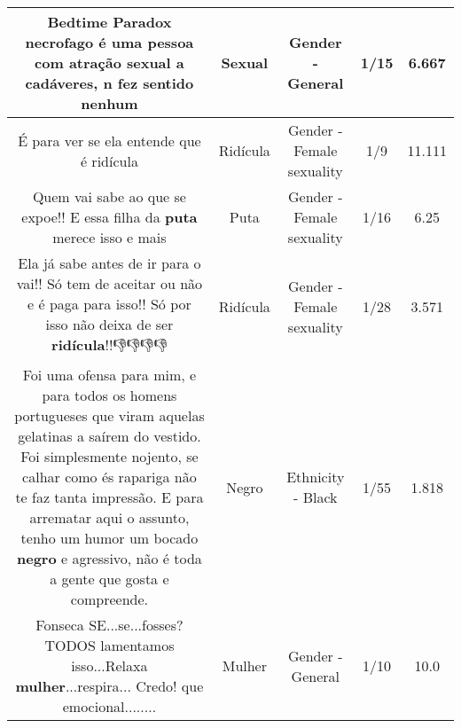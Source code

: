 \documentclass[11pt]{article}
\newlength\mylength
\begin{document}
\begin{center}
\begin{longtable}{|C{.65\mylength}|C{.30\mylength}|C{.12\mylength}|C{.12\mylength}|C{.12\mylength}|}
  \small Bedtime Paradox necrofago  é uma pessoa com atração \textbf{sexual} a cadáveres, n fez sentido nenhum\normalsize   & Sexual & Gender - General & 1/15 & 6.667 \\  \hline
  \small É para ver se ela entende que é ridícula\normalsize   & Ridícula & Gender - Female sexuality & 1/9 & 11.111 \\  \hline
  \small Quem vai sabe ao que se expoe!! E essa filha da \textbf{puta} merece isso e mais\normalsize   & Puta & Gender - Female sexuality & 1/16 & 6.25 \\  \hline
  \small Ela já sabe antes de ir para o vai!! Só tem de aceitar ou não e é paga para isso!! Só por isso não deixa de ser \textbf{ridícula}!!👎👎👎👎\normalsize   & Ridícula & Gender - Female sexuality & 1/28 & 3.571 \\  \hline
  \small Foi uma ofensa para mim, e para todos os homens portugueses que viram aquelas gelatinas a saírem do vestido. Foi simplesmente nojento, se calhar como és rapariga não te faz tanta impressão. E para arrematar aqui o assunto, tenho um humor um bocado \textbf{negro} e agressivo, não é toda a gente que gosta e compreende.\normalsize   & Negro & Ethnicity - Black & 1/55 & 1.818 \\  \hline
  \small {} Fonseca SE...se...fosses? TODOS lamentamos isso...Relaxa \textbf{mulher}...respira... Credo! que emocional........\normalsize   & Mulher & Gender - General & 1/10 & 10.0 \\  \hline
  
\end{longtable}
\end{center}
\end{document}

